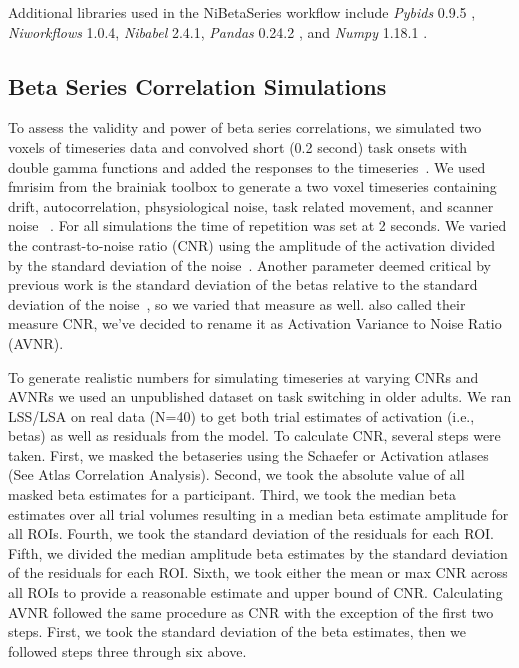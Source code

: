 \documentclass[10pt,letterpaper]{article}
\begin{document}
Additional libraries used in the NiBetaSeries workflow include
\emph{Pybids} 0.9.5 \cite{Yarkoni2019}, \emph{Niworkflows} 1.0.4,
\emph{Nibabel} 2.4.1, \emph{Pandas} 0.24.2 \cite{McKinney2010}, and
\emph{Numpy} 1.18.1 \cite{VanDerWalt2011, Oliphant2006}.

\subsection*{Beta Series Correlation Simulations}

To assess the validity and power of beta series correlations,
we simulated two voxels of timeseries data and convolved short (0.2 second)
task onsets with double gamma functions
and added the responses to the timeseries~\cite{Glover1999,Welvaert2011}.
We used fmrisim from the brainiak toolbox to generate a two voxel timeseries
containing drift, autocorrelation, phsysiological noise,
task related movement, and scanner noise ~\cite{Ellis2020}.
For all simulations the time of repetition was set at 2 seconds.
We varied the contrast-to-noise ratio (CNR) using the amplitude of the activation
divided by the standard deviation of the noise~\cite{Welvaert2013a}.
Another parameter deemed critical by previous work is the standard deviation
of the betas relative to the standard deviation of the noise~\cite{Abdulrahman2016},
so we varied that measure as well.
\cite[Since Abdulrahman \& Henson (2016)]{Abdulrahman2016} also called their measure
CNR, we've decided to rename it as Activation Variance to Noise Ratio (AVNR).

To generate realistic numbers for simulating timeseries at varying CNRs and AVNRs
we used an unpublished dataset on task switching in older adults.
We ran LSS/LSA on real data (N=40) to get both trial estimates of activation (i.e., betas)
as well as residuals from the model.
To calculate CNR, several steps were taken.
First, we masked the betaseries using the Schaefer or Activation atlases (See Atlas Correlation Analysis).
Second, we took the absolute value of all masked beta estimates for a participant.
Third, we took the median beta estimates over all trial volumes resulting
in a median beta estimate amplitude for all ROIs.
Fourth, we took the standard deviation of the residuals for each ROI.
Fifth, we divided the median amplitude beta estimates by the standard deviation of the residuals
for each ROI.
Sixth, we took either the mean or max CNR across all ROIs to provide a reasonable estimate
and upper bound of CNR.
Calculating AVNR followed the same procedure as CNR with the exception of the first two steps.
First, we took the standard deviation of the beta estimates, then we followed steps three through six above.
\end{document}

